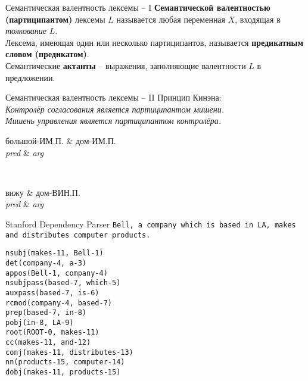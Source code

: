 \documentclass{beamer}
\begin{document}
\begin{frame}{Семантическая валентность лексемы -- I}
\textbf{Семантической валентностью (партиципантом)} лексемы $L$ называется любая переменная $X$, входящая в \textit{толкование} $L$.\\ \medskip
Лексема, имеющая один или несколько партиципантов, называется \textbf{предикатным словом (предикатом)}.\\ \medskip
Семантические \textbf{актанты} -- выражения, заполняющие валентности $L$ в предложении.
\end{frame}

\begin{frame}{Семантическая валентность лексемы -- II}
Принцип Кинэна:\\
\medskip
{\small \textit{Контролёр согласования является партиципантом мишени. \\Мишень управления является партиципантом контролёра.}}

\begin{center}
\begin{dependency}[theme = simple]
   \begin{deptext}[column sep=1em, row sep=1ex]
      большой-ИМ.П. \& дом-ИМ.П. \\
      \textit{pred} \& \textit{arg} \\
   \end{deptext}
\end{dependency}
\\
\begin{dependency}[theme = simple]
   \begin{deptext}[column sep=1em, row sep=1ex]
      вижу \& дом-ВИН.П. \\
      \textit{pred} \& \textit{arg} \\
   \end{deptext}
\end{dependency}
\end{center}
\end{frame}

\begin{frame}[fragile]{Stanford Dependency Parser}
\smallskip
{\small \texttt{Bell, a company which is based in LA, makes and distributes computer products.}}
\medskip
\begin{footnotesize}
\begin{verbatim}
nsubj(makes-11, Bell-1)
det(company-4, a-3)
appos(Bell-1, company-4)
nsubjpass(based-7, which-5)
auxpass(based-7, is-6)
rcmod(company-4, based-7)
prep(based-7, in-8)
pobj(in-8, LA-9)
root(ROOT-0, makes-11)
cc(makes-11, and-12)
conj(makes-11, distributes-13)
nn(products-15, computer-14)
dobj(makes-11, products-15)
\end{verbatim}
\end{footnotesize}
\end{frame}
\end{document}
